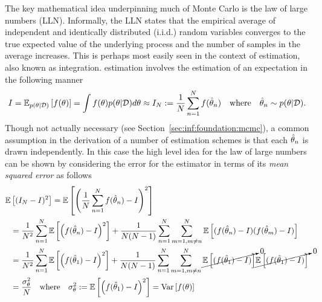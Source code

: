 The key mathematical idea underpinning much of Monte Carlo is the law of large numbers (LLN).  
Informally, the LLN states that the empirical average of independent and identically distributed
(i.i.d.)  random variables converges to the true expected value of the underlying process and the number
of samples in the average increases.  This is perhaps most easily seen in the context of \mc estimation,
also known as \mc integration.  \mc estimation involves the estimation of an expectation in the
following manner
\begin{align}
	\label{eq:inf:mc-est}
	I = \mathbb{E}_{p(\theta|\mathcal{D})}\left[f(\theta)\right] = \int f(\theta)p(\theta | \mathcal{D}) d\theta
	\approx I_N := \frac{1}{N} \sum_{n=1}^{N}f(\hat{\theta}_n)
	\quad \text{where} \quad \hat{\theta}_n \sim p(\theta|\mathcal{D}).
\end{align}
Though not actually necessary (see Section~\ref{sec:inf:foundation:mcmc}), a common assumption
in the derivation of a number of \mc estimation schemes is that each $\hat{\theta}_n$ is drawn
independently.  In this case the high level idea for the law of large numbers can be shown by
considering the error for the \mc estimator in terms of its \emph{mean squared error} as follows
\begin{align}
\mathbb{E} &\left[(I_N-I)^2\right] = \mathbb{E}\left[\left(\frac{1}{N}\sum_{n=1}^{N}f(\hat{\theta}_n) - I\right)^2\right] \nonumber \\
&= \frac{1}{N^2}\sum_{n=1}^{N} \mathbb{E}\left[ \left(f(\hat{\theta}_n)-I\right)^2\right] + 
\frac{1}{N(N-1)}\sum_{n=1}^{N}\sum_{m=1,m\neq n}^{N} \mathbb{E}\left[ (f(\hat{\theta}_n)-I)(f(\hat{\theta}_m)-I)\right] \nonumber \\
&= \frac{1}{N^2}\sum_{n=1}^{N} \mathbb{E}\left[ \left(f(\hat{\theta}_1)-I\right)^2\right] + 
\frac{1}{N(N-1)}\sum_{n=1}^{N}\sum_{m=1,m\neq n}^{N} \cancelto{0}{\mathbb{E}\left[(f(\hat{\theta}_1)-I)\right]} \cancelto{0}{\mathbb{E}\left[ (f(\hat{\theta}_1)-I)\right]} \nonumber \\
&= \frac{\sigma_{\theta}^2}{N}  \quad \text{where} \quad \sigma_{\theta}^2 := \mathbb{E}\left[ \left(f(\hat{\theta}_1)-I\right)^2\right]
= \operatorname*{Var} \left[f(\theta)\right]
\end{align}
